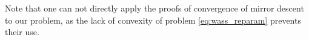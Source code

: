Note that one can not directly apply the proofs of convergence of mirror descent to our problem, as the lack of convexity of problem \eqref{eq:wass_reparam} prevents their use.






